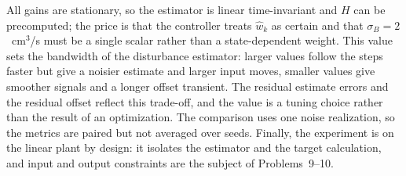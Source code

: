 All gains are stationary, so the estimator is linear time-invariant and $H$ can
be precomputed; the price is that the controller treats $\hat w_k$ as certain
and that $\sigma_B=2$~cm$^3$/s must be a single scalar rather than a
state-dependent weight. This value sets the bandwidth of the disturbance
estimator: larger values follow the steps faster but give a noisier estimate and
larger input moves, smaller values give smoother signals and a longer offset
transient. The residual estimate errors and the residual offset reflect this
trade-off, and the value is a tuning choice rather than the result of an
optimization. The comparison uses one noise realization, so the metrics are
paired but not averaged over seeds. Finally, the experiment is on the linear
plant by design: it isolates the estimator and the target calculation, and input
and output constraints are the subject of Problems~9--10.
